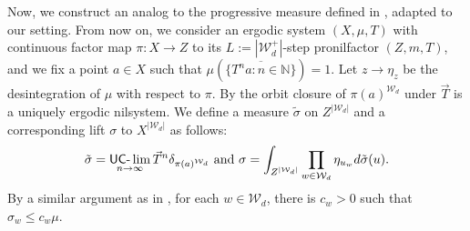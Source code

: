 \documentclass[letter,11pt]{article}
\theoremstyle{definition}
\newcommand{\N}{\mathbb{N}}
\newcommand{\uclim}{\mathop{\textup{\textsf{UC-}}\lim}}
\begin{document}
Now, we construct an analog to the progressive measure defined in \cite{kmrr25}, adapted to our setting. From now on, we consider an ergodic system $(X,\mu,T)$ with continuous factor map $\pi:X\to Z$ to its $L:=|\mathcal{W}_d^{+}|$-step pronilfactor $(Z,m,T)$, and we fix a point $a\in X$ such that $\mu(\overline{ \{T^n a : n\in \N\}})=1$. Let $z\to \eta_z$ be the desintegration of $\mu$ with respect to $\pi$. By \cite[Theorem 11, Chapter 11]{Host_Kra_nilpotent_structures_ergodic_theory:2018} the orbit closure of $\pi(a)^{\mathcal{W}_d}$ under $\Vec{T}$ is a uniquely ergodic nilsystem. We define a measure $\tilde{\sigma}$ on $Z^{|\mathcal{W}_d|}$ and a corresponding lift $\sigma$ to $X^{|\mathcal{W}_d|}$ as follows:
        \begin{equation*}
            \tilde{\sigma}=\uclim_{n\to\infty} \Vec{T}^n \delta_{\pi(a)^{\mathcal{W}_d}} \text{ and }   \sigma=\int_{Z^{|\mathcal{W}_d|}} \prod_{w\in \mathcal{W}_d} \eta_{u_w}  d\tilde{\sigma}(u).
        \end{equation*}     
By a similar argument as in \cite[Lemma 4.6]{kmrr25}, for each $w\in \mathcal{W}_d$, there is $c_w>0$ such that $\sigma_w\leq c_w \mu$.
        
\end{document}
